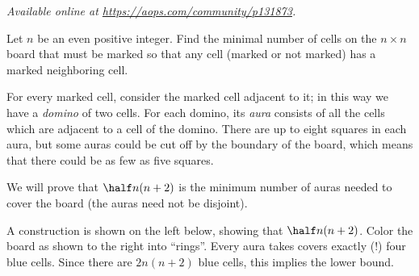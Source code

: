 \textsl{Available online at \url{https://aops.com/community/p131873}.}
\begin{mdframed}[style=mdpurplebox,frametitle={Problem statement}]
Let $n$ be an even positive integer.
Find the minimal number of cells on the $n \times n$ board
that must be marked so that any cell
(marked or not marked) has a marked neighboring cell.
\end{mdframed}
For every marked cell, consider the marked cell adjacent
to it; in this way we have a \emph{domino} of two cells.
For each domino, its \emph{aura} consists of all the cells
which are adjacent to a cell of the domino.
There are up to eight squares in each aura,
but some auras could be cut off by the boundary of the board,
which means that there could be as few as five squares.

We will prove that $\half n (n+2)$
is the minimum number of auras
needed to cover the board
(the auras need not be disjoint).
\begin{itemize}
  \ii A construction is shown on the left below,
  showing that $\half n (n+2)$.
  \ii Color the board as shown to the right into ``rings''.
  Every aura takes covers exactly (!) four blue cells.
  Since there are $2n(n+2)$ blue cells, this implies the lower bound.
\end{itemize}

